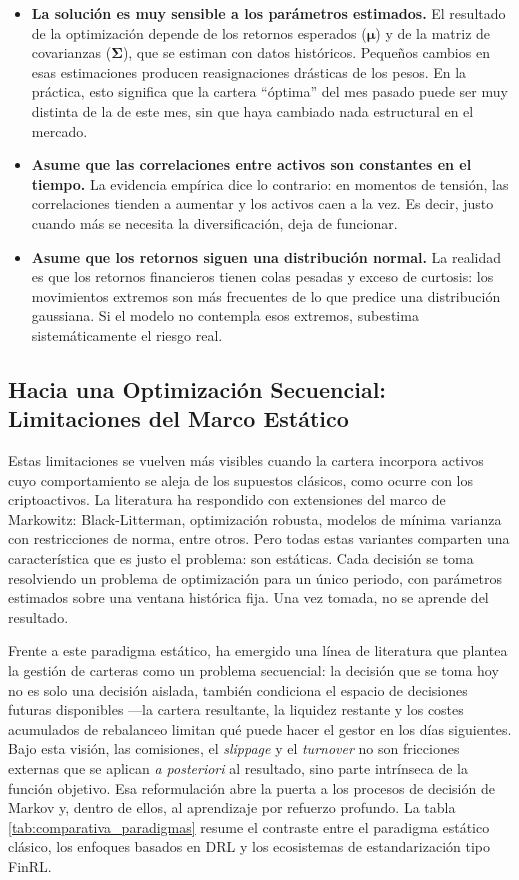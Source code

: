\documentclass[IB,a4paper]{TFUOC}
\begin{document}
\begin{itemize}
    \item \textbf{La solución es muy sensible a los parámetros estimados.} El resultado de la optimización depende de los retornos esperados ($\boldsymbol{\mu}$) y de la matriz de covarianzas ($\boldsymbol{\Sigma}$), que se estiman con datos históricos. Pequeños cambios en esas estimaciones producen reasignaciones drásticas de los pesos. En la práctica, esto significa que la cartera ``óptima'' del mes pasado puede ser muy distinta de la de este mes, sin que haya cambiado nada estructural en el mercado.
    \item \textbf{Asume que las correlaciones entre activos son constantes en el tiempo.} La evidencia empírica dice lo contrario: en momentos de tensión, las correlaciones tienden a aumentar y los activos caen a la vez. Es decir, justo cuando más se necesita la diversificación, deja de funcionar.
    \item \textbf{Asume que los retornos siguen una distribución normal.} La realidad es que los retornos financieros tienen colas pesadas y exceso de curtosis: los movimientos extremos son más frecuentes de lo que predice una distribución gaussiana. Si el modelo no contempla esos extremos, subestima sistemáticamente el riesgo real.
\end{itemize}

\subsection{Hacia una Optimización Secuencial: Limitaciones del Marco Estático}

Estas limitaciones se vuelven más visibles cuando la cartera incorpora activos cuyo comportamiento se aleja de los supuestos clásicos, como ocurre con los criptoactivos. La literatura ha respondido con extensiones del marco de Markowitz: Black-Litterman, optimización robusta, modelos de mínima varianza con restricciones de norma, entre otros. Pero todas estas variantes comparten una característica que es justo el problema: son estáticas. Cada decisión se toma resolviendo un problema de optimización para un único periodo, con parámetros estimados sobre una ventana histórica fija. Una vez tomada, no se aprende del resultado.

Frente a este paradigma estático, ha emergido una línea de literatura que plantea la gestión de carteras como un problema secuencial: la decisión que se toma hoy no es solo una decisión aislada, también condiciona el espacio de decisiones futuras disponibles ---la cartera resultante, la liquidez restante y los costes acumulados de rebalanceo limitan qué puede hacer el gestor en los días siguientes. Bajo esta visión, las comisiones, el \textit{slippage} y el \textit{turnover} no son fricciones externas que se aplican \textit{a posteriori} al resultado, sino parte intrínseca de la función objetivo. Esa reformulación abre la puerta a los procesos de decisión de Markov y, dentro de ellos, al aprendizaje por refuerzo profundo. La tabla \ref{tab:comparativa_paradigmas} resume el contraste entre el paradigma estático clásico, los enfoques basados en DRL y los ecosistemas de estandarización tipo FinRL.
\end{document}
